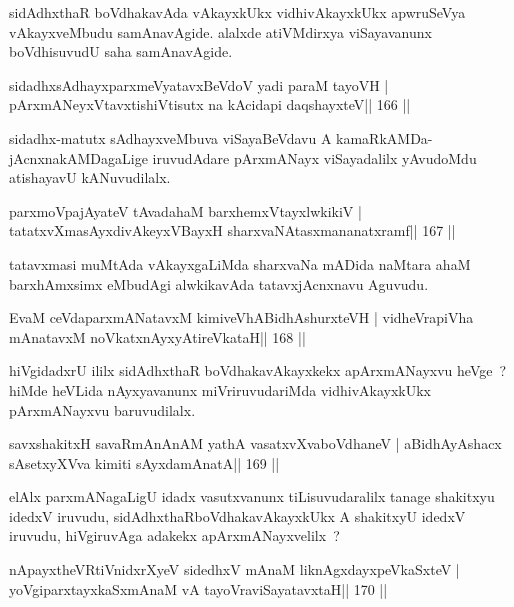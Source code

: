 \begin{artha}
sidAdhxthaR boVdhakavAda vAkayxkUkx vidhivAkayxkUkx apwruSeVya vAkayxveMbudu samAnavAgide. alalxde atiVMdirxya viSayavanunx boVdhisuvudU saha samAnavAgide.
\end{artha}

\begin{shl}
sidadhxsAdhayxparxmeVyatavxBeVdoV yadi paraM tayoVH |
pArxmANeyxVtavxtishiVtisutx na kAcidapi daqshayxteV\hfill || 166 ||
\end{shl}

\begin{artha}
sidadhx-matutx sAdhayxveMbuva viSayaBeVdavu A kamaRkAMDa-jAcnxnakAMDagaLige iruvudAdare pArxmANayx viSayadalilx yAvudoMdu atishayavU kANuvudilalx.
\end{artha}

\begin{shl}
parxmoVpajAyateV tAvadahaM barxhemxVtayxlwkikiV |
tatatxvXmasAyxdivAkeyxVBayxH sharxvaNAtasxmananatxramf\hfill || 167 ||
\end{shl}

\begin{artha}
tatavxmasi muMtAda vAkayxgaLiMda sharxvaNa mADida naMtara ahaM barxhAmxsimx eMbudAgi  alwkikavAda tatavxjAcnxnavu Aguvudu.
\end{artha}

\begin{shl}
EvaM ceVdaparxmANatavxM kimiveVhABidhAshurxteVH |
vidheVrapiVha mAnatavxM noVkatxnAyxyAtireVkataH\hfill || 168 ||
\end{shl}

\begin{artha}
hiVgidadxrU ililx sidAdhxthaR boVdhakavAkayxkekx apArxmANayxvu heVge~? hiMde heVLida nAyxyavanunx miVriruvudariMda vidhivAkayxkUkx pArxmANayxvu baruvudilalx.
\end{artha}

\begin{shl}
savxshakitxH savaRmAnAnAM yathA vasatxvXvaboVdhaneV |
aBidhAyAshacx sA\s setxyXVva kimiti sAyxdamAnatA\hfill || 169 ||
\end{shl}

\begin{artha}
elAlx parxmANagaLigU idadx vasutxvanunx tiLisuvudaralilx tanage shakitxyu idedxV iruvudu, sidAdhxthaRboVdhakavAkayxkUkx A shakitxyU idedxV iruvudu, hiVgiruvAga adakekx apArxmANayxvelilx~? 
\end{artha}

\begin{shl}
nApayxtheVR\s tiVnidxrXyeV sidedhxV mAnaM liknAgxdayxpeVkaSxteV |
yoVgiparxtayxkaSxmAnaM vA tayoVraviSayatavxtaH\hfill || 170 ||
\end{shl}

